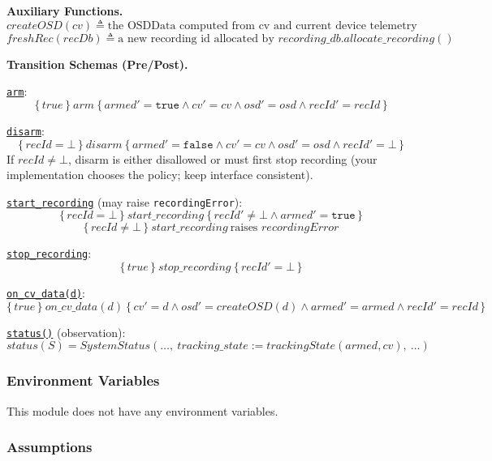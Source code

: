 \documentclass[12pt, titlepage]{article}
\begin{document}
\noindent\textbf{Auxiliary Functions.}
\[
  createOSD(cv) \triangleq \text{the OSDData computed from cv and current device telemetry}
\]
\[
  freshRec(recDb) \triangleq \text{a new recording id allocated by } recording\_db.allocate\_recording()
\]

\noindent\textbf{Transition Schemas (Pre/Post).}

\noindent\underline{\texttt{arm}}:
\[
  \{\, true \,\}\ arm\ \{\, armed'=\texttt{true} \land cv'=cv \land osd'=osd \land recId'=recId \,\}
\]

\noindent\underline{\texttt{disarm}}:
\[
  \{\, recId=\bot \,\}\ disarm\ \{\, armed'=\texttt{false} \land cv'=cv \land osd'=osd \land recId'=\bot \,\}
\]
If \(recId\neq\bot\), disarm is either disallowed or must first stop recording
(your implementation chooses the policy; keep interface consistent).

\noindent\underline{\texttt{start\_recording}} (may raise \texttt{recordingError}):
\[
  \{\, recId=\bot \,\}\ start\_recording\ \{\, recId' \neq \bot \land armed'=\texttt{true} \,\}
\]
\[
  \{\, recId\neq\bot \,\}\ start\_recording\ \text{raises } recordingError
\]

\noindent\underline{\texttt{stop\_recording}}:
\[
  \{\, true \,\}\ stop\_recording\ \{\, recId'=\bot \,\}
\]

\noindent\underline{\texttt{on\_cv\_data(d)}}:
\[
  \{\, true \,\}\ on\_cv\_data(d)\ \{\, cv'=d \land osd'=createOSD(d) \land armed'=armed \land recId'=recId \,\}
\]

\noindent\underline{\texttt{status()}} (observation):
\[
  status(S) = SystemStatus(\ldots,\ tracking\_state := trackingState(armed, cv),\ \ldots)
\]

\subsubsection{Environment Variables}

This module does not have any environment variables.

\subsubsection{Assumptions}
\end{document}

